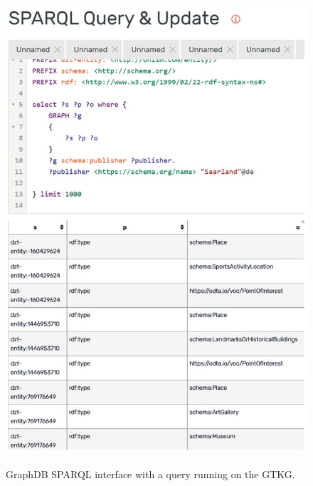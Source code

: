 \documentclass[12pt]{article}
\begin{document}
\begin{figure}
    \includegraphics[width=\linewidth]{imgs/query-example.jpeg}
    \label{fig:query-example}
    \caption{GraphDB SPARQL interface with a query running on the GTKG.}
\end{figure}
\end{document}
